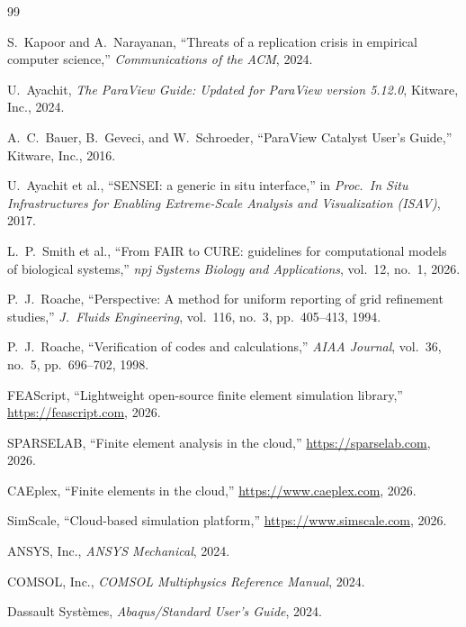 \documentclass[journal]{IEEEtran}
\begin{document}
  \iftrue
  \begin{thebibliography}{99}

  S.~Kapoor and A.~Narayanan,
  ``Threats of a replication crisis in empirical computer science,''
  \emph{Communications of the ACM}, 2024.

  U.~Ayachit,
  \emph{The ParaView Guide: Updated for ParaView version 5.12.0},
  Kitware, Inc., 2024.

  A.~C.~Bauer, B.~Geveci, and W.~Schroeder,
  ``ParaView Catalyst User's Guide,''
  Kitware, Inc., 2016.

  U.~Ayachit et al.,
  ``SENSEI: a generic in situ interface,''
  in \emph{Proc.\ In Situ Infrastructures for Enabling Extreme-Scale
  Analysis and Visualization (ISAV)}, 2017.

  L.~P.~Smith et al.,
  ``From FAIR to CURE: guidelines for computational models of biological
  systems,''
  \emph{npj Systems Biology and Applications}, vol.~12, no.~1, 2026.

  P.~J.~Roache,
  ``Perspective: A method for uniform reporting of grid refinement studies,''
  \emph{J.\ Fluids Engineering}, vol.~116, no.~3, pp.~405--413, 1994.

  P.~J.~Roache,
  ``Verification of codes and calculations,''
  \emph{AIAA Journal}, vol.~36, no.~5, pp.~696--702, 1998.

  FEAScript,
  ``Lightweight open-source finite element simulation library,''
  \url{https://feascript.com}, 2026.

  SPARSELAB,
  ``Finite element analysis in the cloud,''
  \url{https://sparselab.com}, 2026.

  CAEplex,
  ``Finite elements in the cloud,''
  \url{https://www.caeplex.com}, 2026.

  SimScale,
  ``Cloud-based simulation platform,''
  \url{https://www.simscale.com}, 2026.

  ANSYS, Inc.,
  \emph{ANSYS Mechanical}, 2024.

  COMSOL, Inc.,
  \emph{COMSOL Multiphysics Reference Manual}, 2024.

  Dassault Syst\`emes,
  \emph{Abaqus/Standard User's Guide}, 2024.


\end{thebibliography}
\end{document}
